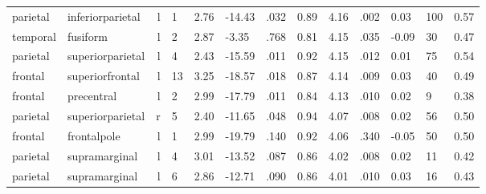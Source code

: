 \documentclass{article}
\begin{document}
\begin{longtable}{llrR{1.3cm}R{1cm}R{1.3cm}R{1cm}R{1cm}R{1.3cm}R{1cm}R{1.8cm}R{1.3cm}R{1.8cm}}
  parietal &          inferiorparietal &    l &         1 &                  2.76 &           -14.43 &               .032 &                               0.89 &                          4.16 &                            .002 &   0.03 &    100 &      0.57 \\
  temporal &                  fusiform &    l &         2 &                  2.87 &            -3.35 &               .768 &                               0.81 &                          4.15 &                            .035 &  -0.09 &     30 &      0.47 \\
  parietal &          superiorparietal &    l &         4 &                  2.43 &           -15.59 &               .011 &                               0.92 &                          4.15 &                            .012 &   0.01 &     75 &      0.54 \\
   frontal &           superiorfrontal &    l &        13 &                  3.25 &           -18.57 &               .018 &                               0.87 &                          4.14 &                            .009 &   0.03 &     40 &      0.49 \\
   frontal &                precentral &    l &         2 &                  2.99 &           -17.79 &               .011 &                               0.84 &                          4.13 &                            .010 &   0.02 &      9 &      0.38 \\
  parietal &          superiorparietal &    r &         5 &                  2.40 &           -11.65 &               .048 &                               0.94 &                          4.07 &                            .008 &   0.02 &     56 &      0.50 \\
   frontal &               frontalpole &    l &         1 &                  2.99 &           -19.79 &               .140 &                               0.92 &                          4.06 &                            .340 &  -0.05 &     50 &      0.50 \\
  parietal &             supramarginal &    l &         4 &                  3.01 &           -13.52 &               .087 &                               0.86 &                          4.02 &                            .008 &   0.02 &     11 &      0.42 \\
  parietal &             supramarginal &    l &         6 &                  2.86 &           -12.71 &               .090 &                               0.86 &                          4.01 &                            .010 &   0.03 &     16 &      0.43 \\

\end{longtable}
\end{document}
